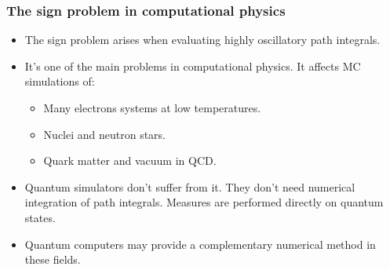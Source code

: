 \documentclass[10pt,t,xcolor=dvipsnames,aspectratio=169]{beamer}
\begin{document}
\begin{frame}
    \frametitle{The sign problem in computational physics}
    \begin{itemize}
        \item
            The sign problem arises when evaluating highly oscillatory path integrals.
        \item
            It's one of the main problems in computational physics.
            It affects MC simulations of:
            \begin{itemize}
                \item Many electrons systems at low temperatures.
                \item Nuclei and neutron stars.
                \item Quark matter and vacuum in QCD.
            \end{itemize}
        \item
            Quantum simulators don't suffer from it.
            They don't need numerical integration of path integrals.
            Measures are performed directly on quantum states.
        \item
            Quantum computers may provide a complementary numerical method in these fields.
    \end{itemize}
\end{frame}
\end{document}
